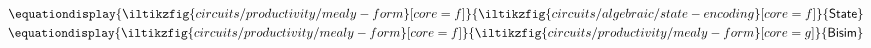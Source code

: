 \documentclass[10pt]{article}
\begin{document}
\begin{figure}
    \centering
    \(\equationdisplay{
        \iltikzfig{circuits/productivity/mealy-form}[core=f]
    }{
        \iltikzfig{circuits/algebraic/state-encoding}[core=f]
    }{\mathsf{State}}\)
    \quad
    \(\equationdisplay{
        \iltikzfig{circuits/productivity/mealy-form}[core=f]
    }{
        \iltikzfig{circuits/productivity/mealy-form}[core=g]
    }{\mathsf{Bisim}}\)
\end{figure}

\printbibliography[heading=bibintoc,title={References}]
\end{document}
